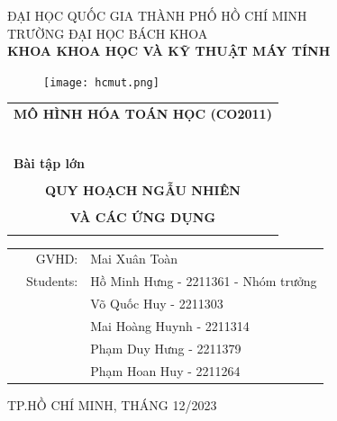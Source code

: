 \documentclass[a4paper]{article}
\begin{document}
\begin{titlepage}
\begin{center}
ĐẠI HỌC QUỐC GIA THÀNH PHỐ HỒ CHÍ MINH \\
TRƯỜNG ĐẠI HỌC BÁCH KHOA \\
\textbf{KHOA KHOA HỌC VÀ KỸ THUẬT MÁY TÍNH}
\end{center}

\vspace{1cm}

\begin{figure}[h!]
\begin{center}
\texttt{[image: hcmut.png]}
\end{center}
\end{figure}

\vspace{1cm}


\begin{center}
\begin{tabular}{c}
\multicolumn{1}{l}{\textbf{{\Large MÔ HÌNH HÓA TOÁN HỌC (CO2011)}}}\\
~~\\
\hline
\\
\multicolumn{1}{l}{\textbf{{\Large Bài tập lớn}}}\\
\\
\textbf{{\Huge QUY HOẠCH NGẪU NHIÊN}}\\
\\
\textbf{{\Huge VÀ CÁC ỨNG DỤNG}}\\
\\
\hline
\end{tabular}
\end{center}

\vspace{2cm}

\begin{table}[h]
\begin{tabular}{rrl}
\hspace{5 cm} & GVHD: & Mai Xuân Toàn\\
& Students: & Hồ Minh Hưng - 2211361 - Nhóm trưởng \\
& &  Võ Quốc Huy - 2211303 \\
& &  Mai Hoàng Huynh - 2211314 \\
& &  Phạm Duy Hưng - 2211379 \\
& &  Phạm Hoan Huy - 2211264 \\
\end{tabular}
\end{table}

\begin{center}
{\footnotesize TP.HỒ CHÍ MINH, THÁNG 12/2023}
\end{center}
\end{titlepage}
\end{document}
